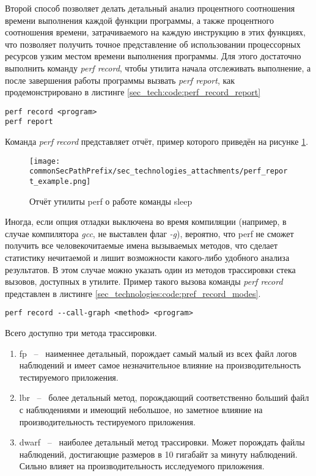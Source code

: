Второй способ позволяет делать детальный анализ процентного соотношения времени выполнения каждой функции программы, 
а также процентного соотношения времени, затрачиваемого на каждую инструкцию в этих функциях, что позволяет 
получить точное представление об использовании процессорных ресурсов узким местом времени выполнения программы. Для этого
достаточно выполнить команду \textit{perf record}, чтобы утилита начала отслеживать выполнение, а после завершения работы программы
вызвать \textit{perf report}, как продемонстрировано в листинге \ref{sec_tech:code:perf_record_report}

\begin{lstlisting}[style=CodeListing, label=sec_tech:code:perf_record_report, caption={Пример использования команд perf record и perf report}]
perf record <program>
perf report
\end{lstlisting}

Команда \textit{perf record} представляет отчёт, пример которого приведён на рисунке \ref{sec_technologies:fig:perf_report_example}.
\begin{figure}[ht]
    \centering
    \texttt{[image: \\commonSecPathPrefix/sec\_technologies\_attachments/perf\_report\_example.png]}
    \caption{Отчёт утилиты perf о работе команды sleep}
    \label{sec_technologies:fig:perf_report_example}
\end{figure}

Иногда, если опция отладки выключена во время компиляции (например, в случае компилятора \textit{gcc}, не выставлен флаг \textit{-g}),
вероятно, что perf не сможет получить все человекочитаемые имена вызываемых методов, что сделает статистику 
нечитаемой и лишит возможности какого-либо удобного анализа результатов. 
В этом случае можно указать один из методов трассировки стека вызовов, доступных в утилите.
Пример такого вызова команды \textit{perf record} представлен в листинге \ref{sec_technologies:code:pref_record_modes}.

\begin{lstlisting}[style=CodeListing, label=sec_technologies:code:pref_record_modes, caption={Вызов команды perf record с указанием метода трассировки стека вызовов}]
perf record --call-graph <method> <program>
\end{lstlisting}

Всего доступно три метода трассировки.
\begin{enumerate}
    \item fp ~--~ наименнее детальный, порождает самый малый из всех файл логов наблюдений и имеет самое незначительное влияние на производительность тестируемого приложения.
    \item lbr ~--~ более детальный метод, порождающий соответственно больший файл с наблюдениями и имеющий небольшое, но заметное влияние на производительность тестируемого приложения.
    \item dwarf ~--~ наиболее детальный метод трассировки. Может порождать файлы наблюдений, достигающие размеров в 10 гигабайт за минуту наблюдений. Сильно влияет на производительность исследуемого приложения.
\end{enumerate}

